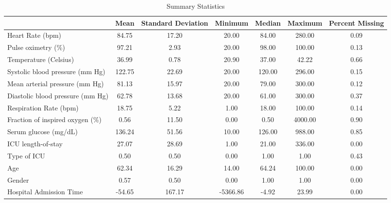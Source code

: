 \begin{table}
\centering
\caption{Summary Statistics}
\label{tab_describe}
\begin{tabular}{lcccccc}
\toprule
{} &   Mean & Standard Deviation &  Minimum & Median & Maximum & Percent Missing \\
\midrule
Heart Rate (bpm)                 &  84.75 &              17.20 &    20.00 &  84.00 &  280.00 &            0.09 \\
Pulse oximetry (\%)               &  97.21 &               2.93 &    20.00 &  98.00 &  100.00 &            0.13 \\
Temperature (Celsius)            &  36.99 &               0.78 &    20.90 &  37.00 &   42.22 &            0.66 \\
Systolic blood pressure (mm Hg)  & 122.75 &              22.69 &    20.00 & 120.00 &  296.00 &            0.15 \\
Mean arterial pressure (mm Hg)   &  81.13 &              15.97 &    20.00 &  79.00 &  300.00 &            0.12 \\
Diastolic blood pressure (mm Hg) &  62.78 &              13.68 &    20.00 &  61.00 &  300.00 &            0.37 \\
Respiration Rate (bpm)           &  18.75 &               5.22 &     1.00 &  18.00 &  100.00 &            0.14 \\
Fraction of inspired oxygen (\%)  &   0.56 &              11.50 &     0.00 &   0.50 & 4000.00 &            0.90 \\
Serum glucose (mg/dL)            & 136.24 &              51.56 &    10.00 & 126.00 &  988.00 &            0.85 \\
ICU length-of-stay               &  27.07 &              28.69 &     1.00 &  21.00 &  336.00 &            0.00 \\
Type of ICU                      &   0.50 &               0.50 &     0.00 &   1.00 &    1.00 &            0.43 \\
Age                              &  62.34 &              16.29 &    14.00 &  64.24 &  100.00 &            0.00 \\
Gender                           &   0.57 &               0.50 &     0.00 &   1.00 &    1.00 &            0.00 \\
Hospital Admission Time          & -54.65 &             167.17 & -5366.86 &  -4.92 &   23.99 &            0.00 \\
\bottomrule
\end{tabular}
\end{table}
